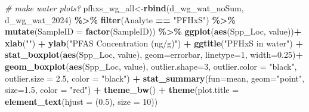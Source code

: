 \documentclass[
]{article}
\newenvironment{Shaded}{\begin{snugshade}}{\end{snugshade}}
\newcommand{\AttributeTok}[1]{\textcolor[rgb]{0.13,0.29,0.53}{#1}}
\newcommand{\CommentTok}[1]{\textcolor[rgb]{0.56,0.35,0.01}{\textit{#1}}}
\newcommand{\DecValTok}[1]{\textcolor[rgb]{0.00,0.00,0.81}{#1}}
\newcommand{\FloatTok}[1]{\textcolor[rgb]{0.00,0.00,0.81}{#1}}
\newcommand{\FunctionTok}[1]{\textcolor[rgb]{0.13,0.29,0.53}{\textbf{#1}}}
\newcommand{\NormalTok}[1]{#1}
\newcommand{\OtherTok}[1]{\textcolor[rgb]{0.56,0.35,0.01}{#1}}
\newcommand{\SpecialCharTok}[1]{\textcolor[rgb]{0.81,0.36,0.00}{\textbf{#1}}}
\newcommand{\StringTok}[1]{\textcolor[rgb]{0.31,0.60,0.02}{#1}}
\begin{document}
\begin{Shaded}
\begin{Highlighting}[]
\CommentTok{\# make water plots?}
\NormalTok{pfhxs\_wg\_all}\OtherTok{\textless{}{-}}\FunctionTok{rbind}\NormalTok{(d\_wg\_wat\_noSum, d\_wg\_wat\_2024) }\SpecialCharTok{\%\textgreater{}\%} 
  \FunctionTok{filter}\NormalTok{(Analyte }\SpecialCharTok{==} \StringTok{"PFHxS"}\NormalTok{) }\SpecialCharTok{\%\textgreater{}\%} 
  \FunctionTok{mutate}\NormalTok{(}\AttributeTok{SampleID =} \FunctionTok{factor}\NormalTok{(SampleID)) }\SpecialCharTok{\%\textgreater{}\%} 
  \FunctionTok{ggplot}\NormalTok{(}\FunctionTok{aes}\NormalTok{(Spp\_Loc, value))}\SpecialCharTok{+}
    \FunctionTok{xlab}\NormalTok{(}\StringTok{""}\NormalTok{) }\SpecialCharTok{+}
    \FunctionTok{ylab}\NormalTok{(}\StringTok{"PFAS Concentration (ng/g)"}\NormalTok{) }\SpecialCharTok{+}
    \FunctionTok{ggtitle}\NormalTok{(}\StringTok{"PFHxS in water"}\NormalTok{) }\SpecialCharTok{+}
    \FunctionTok{stat\_boxplot}\NormalTok{(}\FunctionTok{aes}\NormalTok{(Spp\_Loc, value),}
                 \AttributeTok{geom=}\StringTok{\textquotesingle{}errorbar\textquotesingle{}}\NormalTok{, }\AttributeTok{linetype=}\DecValTok{1}\NormalTok{, }\AttributeTok{width=}\FloatTok{0.25}\NormalTok{)}\SpecialCharTok{+}
    \FunctionTok{geom\_boxplot}\NormalTok{(}\FunctionTok{aes}\NormalTok{(Spp\_Loc, value),}
                 \AttributeTok{outlier.shape=}\DecValTok{3}\NormalTok{,}
                 \AttributeTok{outlier.color =} \StringTok{"black"}\NormalTok{,}
                 \AttributeTok{outlier.size =} \FloatTok{2.5}\NormalTok{,}
                 \AttributeTok{color =} \StringTok{"black"}\NormalTok{) }\SpecialCharTok{+} 
    \FunctionTok{stat\_summary}\NormalTok{(}\AttributeTok{fun=}\NormalTok{mean, }\AttributeTok{geom=}\StringTok{"point"}\NormalTok{, }\AttributeTok{size=}\FloatTok{1.5}\NormalTok{, }\AttributeTok{color =} \StringTok{"red"}\NormalTok{) }\SpecialCharTok{+}
    \FunctionTok{theme\_bw}\NormalTok{() }\SpecialCharTok{+}
    \FunctionTok{theme}\NormalTok{(}\AttributeTok{plot.title =} \FunctionTok{element\_text}\NormalTok{(}\AttributeTok{hjust =}\NormalTok{ (}\FloatTok{0.5}\NormalTok{), }\AttributeTok{size =} \DecValTok{10}\NormalTok{))}


\end{Highlighting}
\end{Shaded}
\end{document}
